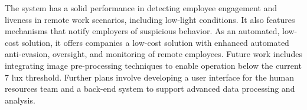 \documentclass[english,hidelinks]{sbrt}
\begin{document}
The system has a solid performance in detecting employee engagement and liveness in remote work scenarios, including low-light conditions. It also features mechanisms that notify employers of suspicious behavior. As an automated, low-cost solution, it offers companies a low-cost solution with enhanced automated anti-evasion, oversight, and monitoring of remote employees. Future work includes integrating image pre-processing techniques to enable operation below the current 7 lux threshold. Further plans involve developing a user interface for the human resources team and a back-end system to support advanced data processing and analysis.




\end{document}
